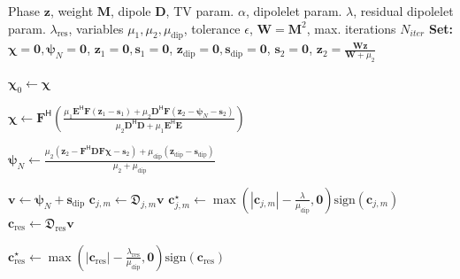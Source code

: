 \documentclass{article}
\begin{document}
\begin{algorithm}[htbp]
\caption{Dipole-let Regularizer}
\label{alg:dip}
\begin{algorithmic}[1]
\Require Phase $\mathbf{z}$, weight $\mathbf{M}$, dipole $\mathbf{D}$, TV param. $\alpha$, dipolelet param. $\lambda$, residual dipolelet param. $\lambda_{\text{res}}$, variables $\mu_1, \mu_2, \mu_{\text{dip}}$, tolerance $\epsilon$, $\mathbf{W}=\mathbf{M}^{2}$, max. iterations $N_{iter}$
\State \textbf{Set:} $\bm{\chi} = \mathbf{0}, \bm{\psi}_{N} = \mathbf{0}$, $\mathbf{z}_1 = \mathbf{0}, \mathbf{s}_1 = \mathbf{0}$, $\mathbf{z}_{\text{dip}} = \mathbf{0},  \mathbf{s}_{\text{dip}} = \mathbf{0}$, $\mathbf{s}_{2} = \mathbf{0}$, $\mathbf{z}_{2} = \frac{\mathbf{W} \mathbf{z}}{\mathbf{W} + \mu_2}$

    \State $\bm{\chi}_{0} \gets \bm{\chi}$

    \State $\bm{\chi} \gets \mathbf{F}^\mathsf{H} \left( \frac{\mu_1 \mathbf{E}^\mathsf{H} \mathbf{F} (\mathbf{z}_1 - \mathbf{s}_1) + \mu_2 \mathbf{D}^\mathsf{H} \mathbf{F} (\mathbf{z}_{2} - \bm{\psi}_{N} - \mathbf{s}_{2})}{\mu_2 \mathbf{D}^\mathsf{H} \mathbf{D} + \mu_1 \mathbf{E}^\mathsf{H} \mathbf{E}} \right)$

    \State $\bm{\psi}_{N} \gets \frac{\mu_2 (\mathbf{z}_{2} - \mathbf{F}^\mathsf{H} \mathbf{D} \mathbf{F} \bm{\chi} - \mathbf{s}_{2}) + \mu_{\text{dip}} (\mathbf{z}_{\text{dip}} - \mathbf{s}_{\text{dip}})}{\mu_2 + \mu_{\text{dip}}}$

    \State $\mathbf{v} \gets \bm{\psi}_{N} + \mathbf{s}_{\text{dip}}$
        \State $\mathbf{c}_{j,m} \gets \bm{\mathfrak{D}}_{j,m}\mathbf{v}$ %
        \State $\mathbf{c}_{j,m}^{\star} \gets \max\left(|\mathbf{c}_{j,m}| - \frac{\lambda}{\mu_{\text{dip}}}, \mathbf{0}\right) \text{sign}(\mathbf{c}_{j,m})$ %
    \EndFor
    \State $\mathbf{c}_{\text{res}} \gets \bm{\mathfrak{D}}_{\text{res}}\mathbf{v}$ %
    
    \State $\mathbf{c}_{\text{res}}^{\star} \gets \max\left(|\mathbf{c}_{\text{res}}| - \frac{\lambda_{\text{res}}}{\mu_{\text{dip}}}, \mathbf{0}\right) \text{sign}(\mathbf{c}_{\text{res}})$ %
    

\end{algorithmic}
\end{algorithm}
\end{document}
